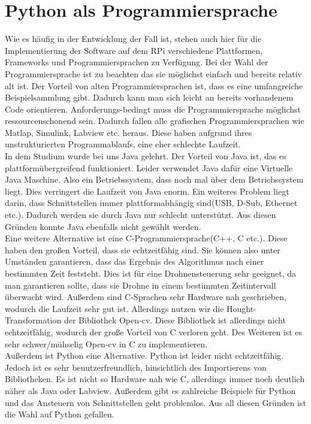 \section{Python als Programmiersprache}
Wie es häufig in der Entwicklung der Fall ist, stehen auch hier für die Implementierung
der Software auf dem RPi verschiedene Plattformen, Frameworks und
Programmiersprachen zu Verfügung. Bei der Wahl der Programmiersprache ist zu beachten das sie möglichst einfach und bereits relativ alt ist. Der Vorteil von alten Programmiersprachen ist, dass es eine umfangreiche Beispielsammlung gibt. Dadurch kann man sich leicht an bereits vorhandenem Code orientieren.
Anforderungs-bedingt muss die Programmiersprache möglichst ressourcenschonend sein.
Dadurch fallen alle grafischen Programmiersprachen wie Matlap, Simulink, Labview etc. heraus. Diese haben aufgrund ihres unstrukturierten Programmablaufs, eine eher schlechte Laufzeit.\\ 
In dem Studium wurde bei uns Java gelehrt. Der Vorteil von Java ist, das es plattformübergreifend funktioniert. Leider verwendet Java dafür eine Virtuelle Java Maschine. Also ein Betriebssystem, dass noch mal über dem Betriebssystem liegt. Dies verringert die Laufzeit von Java enorm. Ein weiteres Problem liegt darin, dass Schnittstellen immer plattformabhängig sind(USB, D-Sub, Ethernet etc.). Dadurch werden sie durch Java nur schlecht unterstützt. Aus diesen Gründen konnte Java ebenfalls nicht gewählt werden.\\

Eine weitere Alternative ist eine C-Programmiersprache(C++, C etc.). Diese haben den großen Vorteil, dass sie echtzeitfähig sind. Sie können also unter Umständen garantieren, dass das Ergebnis des Algorithmus nach einer bestimmten Zeit feststeht. Dies ist für eine Drohnensteuerung sehr geeignet, da man garantieren sollte, dass sie Drohne in einem bestimmten Zeitintervall überwacht wird. Außerdem sind C-Sprachen sehr Hardware nah geschrieben, wodurch die Laufzeit sehr gut ist. Allerdings nutzen wir die Hought-Transformation der Bibliothek Open-cv. Diese Bibliothek ist allerdings nicht echtzeitfähig, wodurch der große Vorteil von C verloren geht. Des Weiteren ist es sehr schwer/mühselig Open-cv in C zu implementieren.\\

Außerdem ist Python eine Alternative. Python ist leider nicht echtzeitfähig. Jedoch ist es sehr benutzerfreundlich, hinsichtlich des Importierens von Bibliotheken. Es ist nicht so Hardware nah wie C, allerdings immer noch deutlich näher als Java oder Labview. Außerdem gibt es zahlreiche Beispiele für Python und das Ansteuern von Schnittstellen geht problemlos. Aus all diesen Gründen ist die Wahl auf Python gefallen.
